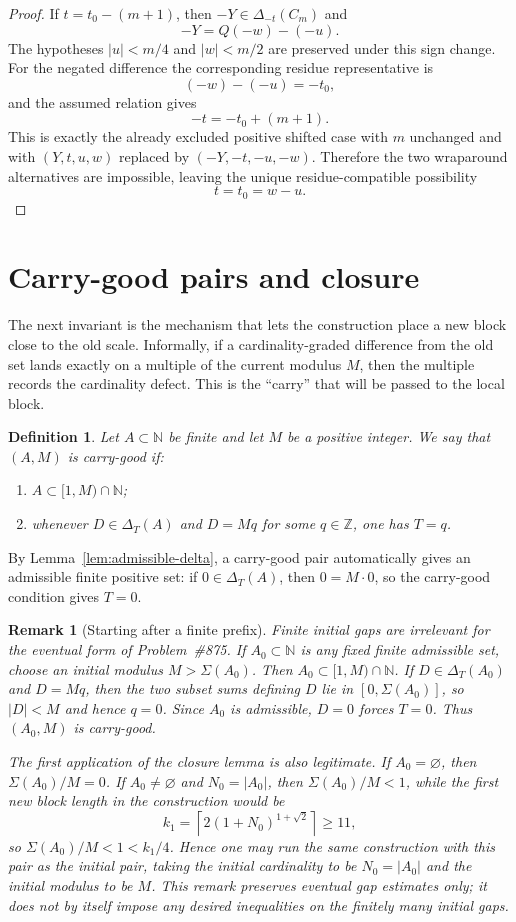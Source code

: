 \documentclass[11pt]{article}
\newtheorem{definition}{Definition}
\newtheorem{remark}{Remark}
\newcommand{\N}{\mathbb{N}}
\newcommand{\Z}{\mathbb{Z}}
\newcommand{\D}{\Delta}
\newcommand{\Sig}{\Sigma}
\begin{document}
\begin{proof}
If $t=t_0-(m+1)$, then $-Y\in\D_{-t}(C_m)$ and
\[
        -Y=Q(-w)-(-u).
\]
The hypotheses $|u|<m/4$ and $|w|<m/2$ are preserved under this sign change.  For the negated difference the corresponding residue representative is
\[
        (-w)-(-u)=-t_0,
\]
and the assumed relation gives
\[
        -t=-t_0+(m+1).
\]
This is exactly the already excluded positive shifted case with $m$ unchanged and with $(Y,t,u,w)$ replaced by $(-Y,-t,-u,-w)$.  Therefore the two wraparound alternatives are impossible, leaving the unique residue-compatible possibility
\[
        t=t_0=w-u.
\]
\end{proof}

\section{Carry-good pairs and closure}

The next invariant is the mechanism that lets the construction place a new block close to the old scale.  Informally, if a cardinality-graded difference from the old set lands exactly on a multiple of the current modulus $M$, then the multiple records the cardinality defect.  This is the ``carry'' that will be passed to the local block.

\begin{definition}
Let $A\subset\N$ be finite and let $M$ be a positive integer.  We say that $(A,M)$ is \emph{carry-good} if:
\begin{enumerate}
    \item $A\subset [1,M)\cap\N$;
    \item whenever $D\in \D_T(A)$ and $D=Mq$ for some $q\in\Z$, one has $T=q$.
\end{enumerate}
\end{definition}

By Lemma~\ref{lem:admissible-delta}, a carry-good pair automatically gives an admissible finite positive set: if $0\in \D_T(A)$, then $0=M\cdot0$, so the carry-good condition gives $T=0$.

\begin{remark}[Starting after a finite prefix]\label{rem:prefix}
Finite initial gaps are irrelevant for the eventual form of Problem~\#875.  If $A_0\subset\N$ is any fixed finite admissible set, choose an initial modulus $M>\Sig(A_0)$.  Then $A_0\subset[1,M)\cap\N$.  If $D\in\D_T(A_0)$ and $D=Mq$, then the two subset sums defining $D$ lie in $[0,\Sig(A_0)]$, so $|D|<M$ and hence $q=0$.  Since $A_0$ is admissible, $D=0$ forces $T=0$.  Thus $(A_0,M)$ is carry-good.

The first application of the closure lemma is also legitimate.  If $A_0=\varnothing$, then $\Sig(A_0)/M=0$.  If $A_0\ne\varnothing$ and $N_0=|A_0|$, then $\Sig(A_0)/M<1$, while the first new block length in the construction would be
\[
        k_1=\left\lceil 2(1+N_0)^{1+\sqrt2}\right\rceil\ge 11,
\]
so $\Sig(A_0)/M<1<k_1/4$.  Hence one may run the same construction with this pair as the initial pair, taking the initial cardinality to be $N_0=|A_0|$ and the initial modulus to be $M$.  This remark preserves eventual gap estimates only; it does not by itself impose any desired inequalities on the finitely many initial gaps.
\end{remark}
\end{document}
